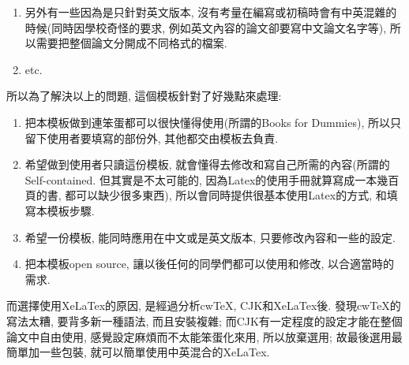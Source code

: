 \begin{enumerate}
{\begin{enumerate}
      \item
      {
        另外有一些因為是只針對英文版本, 沒有考量在編寫或初稿時會有中英混雜的時候(同時因學校奇怪的要求, 例如英文內容的論文卻要寫中文論文名字等), 所以需要把整個論文分開成不同格式的檔案.
      } %

      \item
      {
        etc.
      } %
    \end{enumerate}
  } %
\end{enumerate}


所以為了解決以上的問題, 這個模板針對了好幾點來處理:

\begin{enumerate}

  \item
  {
    把本模板做到連笨蛋都可以很快懂得使用(所謂的Books for Dummies), 所以只留下使用者要填寫的部份外, 其他都交由模板去負責.
  } %

  \item
  {
    希望做到使用者只讀這份模板, 就會懂得去修改和寫自己所需的內容(所謂的Self-contained. 但其實是不太可能的, 因為Latex的使用手冊就算寫成一本幾百頁的書, 都可以缺少很多東西), 所以會同時提供很基本使用Latex的方式, 和填寫本模板步驟.
  } %

  \item
  {
    希望一份模板, 能同時應用在中文或是英文版本, 只要修改內容和一些的設定.
  } %

  \item
  {
    把本模板open source, 讓以後任何的同學們都可以使用和修改, 以合適當時的需求.
  } %

\end{enumerate}

而選擇使用XeLaTex的原因, 是經過分析cwTeX, CJK和XeLaTex後. 發現cwTeX的寫法太糟, 要背多新一種語法, 而且安裝複雜; 而CJK有一定程度的設定才能在整個論文中自由使用, 感覺設定麻煩而不太能笨蛋化來用, 所以放棄選用; 故最後選用最簡單加一些包裝, 就可以簡單使用中英混合的XeLaTex.


